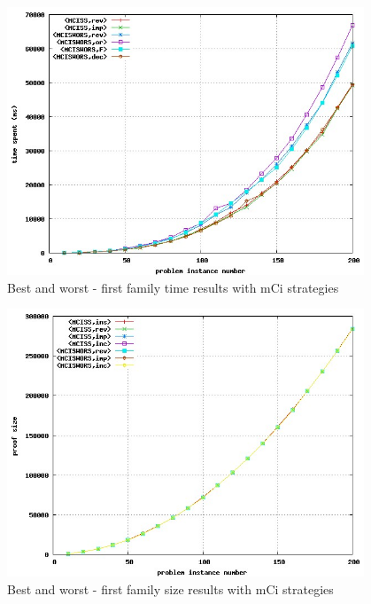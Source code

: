 \documentclass[a4paper,10pt]{book}
\newcommand{\mci}{mCi}
\begin{document}
\begin{figure}[!htbp]
\begin{center}
\includegraphics[width=0.95\textwidth]{../mci_1_c.jpg}
\end{center}
\caption{Best and worst - first family time results with \mci\/ strategies}
\end{figure}


\begin{figure}[!htbp]
\begin{center}
\includegraphics[width=0.95\textwidth]{../mci_1_d.jpg}
\end{center}
\caption{Best and worst - first family size results with \mci\/ strategies}
\end{figure}
\end{document}

